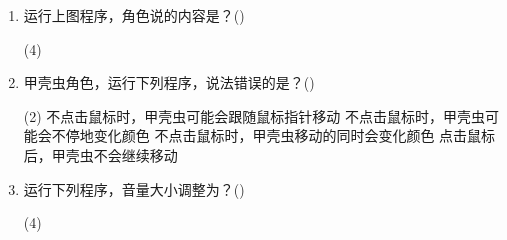 \documentclass[10pt, a4paper]{article}
\newcommand{\hq}{\hfill(\qquad)}
\begin{document}
\begin{enumerate}
        \item 运行上图程序，角色说的内容是？\hq
        \begin{tasks}(4)
        \end{tasks}

        \newpage
        \item 甲壳虫角色，运行下列程序，说法错误的是？\hq
        \begin{tasks}(2)
            \task 不点击鼠标时，甲壳虫可能会跟随鼠标指针移动
            \task 不点击鼠标时，甲壳虫可能会不停地变化颜色
            \task 不点击鼠标时，甲壳虫移动的同时会变化颜色
            \task 点击鼠标后，甲壳虫不会继续移动
        \end{tasks}

        \item 运行下列程序，音量大小调整为？\hq
        \begin{tasks}(4)
        \end{tasks}


\end{enumerate}
\end{document}
